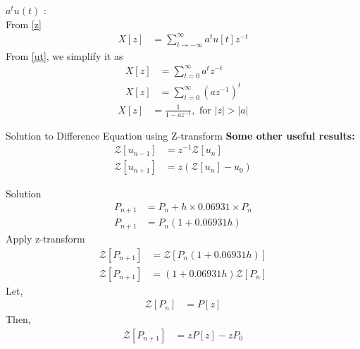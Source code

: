 \documentclass{beamer}
\providecommand{\sbrak}[1]{\ensuremath{{}\left[#1\right]}}
\providecommand{\brak}[1]{\ensuremath{\left(#1\right)}}
\theoremstyle{remark}
\providecommand{\abs}[1]{\left\vert#1\right\vert}
\numberwithin{equation}{section}
\begin{document}
\begin{frame}
        \textbf{$a^t u(t)$} : \\
		From \eqref{z} 
		\begin{align}
			X\sbrak{z} &= \sum_{t \to -\infty}^{\infty} a^t u\sbrak{t} z^{-t} 
		\end{align}
		From \eqref{ut}, we simplify it as
		\begin{align}
			X\sbrak{z} &= \sum_{t=0}^{\infty} a^t z^{-t} \\
			X\sbrak{z} &= \sum_{t=0}^{\infty} \brak{az^{-1}}^{t} 
            \end{align}
            \begin{align}
			X\sbrak{z} &= \frac{1}{1 - az^{-1}}, \text{ for } \abs{z} > \abs{a} \label{eq:atut}
		\end{align}
\end{frame}

\begin{frame}{Solution to Difference Equation using Z-transform}
        \textbf{Some other useful results:}
        \begin{align}
			\mathcal{Z}\sbrak{u_{n-1}} &= z^{-1} \mathcal{Z}\sbrak{u_{n}} \\
			\mathcal{Z}\sbrak{u_{n+1}} &= z \brak{\mathcal{Z}\sbrak{u_{n}} - u_{0}}
		\end{align}
        \end{frame}

\begin{frame}{Solution}
\begin{align}
            P_{n+1} &= P_{n}+h \times 0.06931 \times P_n\\
            P_{n+1} &= P_{n}\brak{1 + 0.06931h}
        \end{align}
        Apply z-transform
        \begin{align}
            \mathcal{Z}\sbrak{P_{n+1}} &= \mathcal{Z}\sbrak{P_{n}\brak{1 + 0.06931h}}\\
            \mathcal{Z}\sbrak{P_{n+1}} &= \brak{1+0.06931h}\mathcal{Z}\sbrak{P_{n}}
        \end{align}
        Let,
        \begin{align}
            \mathcal{Z}\sbrak{P_n} &=P\sbrak{z}
        \end{align}
    Then,
        \begin{align}
            \mathcal{Z}\sbrak{P_{n+1}} &=zP\sbrak{z}-zP_0
        \end{align}
    \end{frame}
\end{document}
